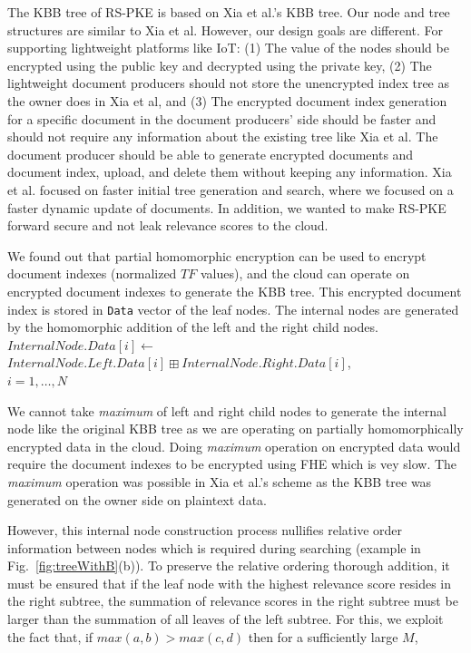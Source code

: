\documentclass[sigconf,pdftex]{acmart}
\begin{document}
The KBB tree of RS-PKE is based on Xia et al.'s KBB tree. Our node and tree structures are similar to Xia et al. However, our design goals are different. For supporting lightweight platforms like IoT: (1) The value of the nodes should be encrypted using the public key and decrypted using the private key,
(2) The lightweight document producers should not store the unencrypted index tree as the owner does in Xia et al, and
(3) The encrypted document index generation for a specific document in the document producers' side should be faster and should not require any information about the existing tree like Xia et al. The document producer should be able to generate encrypted documents and document index, upload, and delete them without keeping any information. Xia et al. focused on faster initial tree generation and search, where we focused on a faster dynamic update of documents. In addition, we wanted to make RS-PKE forward secure and not leak relevance scores to the cloud.


We found out that partial homomorphic encryption can be used to encrypt document indexes (normalized $TF$ values), and the cloud can operate on encrypted document indexes to generate the KBB tree. This encrypted document index is stored in \texttt{Data} vector of the leaf nodes. The internal nodes are generated by the homomorphic addition of the left and the right child nodes.
\newline$InternalNode.Data[i] \xleftarrow{}$\\ $InternalNode.Left.Data[i] \boxplus InternalNode.Right.Data[i]$,\\
    $i= 1, \dots, N$
    

We cannot take \textit{maximum} of left and right child nodes to generate the internal node like the original KBB tree as we are operating on partially homomorphically encrypted data in the cloud. Doing \textit{maximum} operation on encrypted data would require the document indexes to be encrypted using FHE which is vey slow. The \textit{maximum} operation was possible in Xia et al.'s scheme as the KBB tree was generated on the owner side on plaintext data.  

However, this internal node construction process nullifies relative order information between nodes which is required during searching (example in Fig.~\ref{fig:treeWithB}(b)). To preserve the relative ordering thorough addition, it must be ensured that if the leaf node with the highest relevance score resides in the right subtree, the summation of relevance scores in the right subtree must be larger than the summation of all leaves of the left subtree.
For this, we exploit the fact that, if $max(a, b) > max(c, d)$ then for a sufficiently large $M$,
\end{document}
